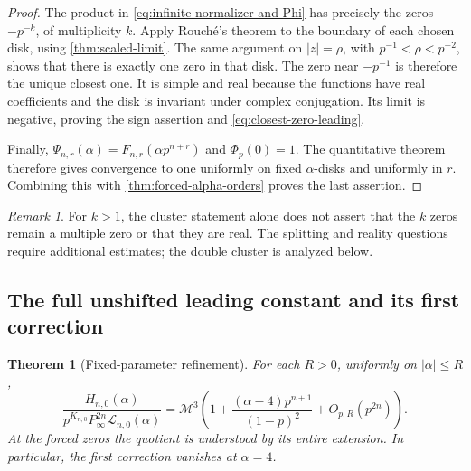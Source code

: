 \documentclass[11pt]{article}
\numberwithin{equation}{section}
\newtheorem{theorem}{Theorem}[section]
\theoremstyle{definition}
\theoremstyle{remark}
\newtheorem{remark}[remark]{Remark}
\begin{document}
\begin{proof}
The product in \eqref{eq:infinite-normalizer-and-Phi} has precisely the
zeros $-p^{-k}$, of multiplicity $k$. Apply Rouch\'e's theorem to the
boundary of each chosen disk, using \cref{thm:scaled-limit}.
The same argument on $|z|=\rho$, with $p^{-1}<\rho<p^{-2}$,
shows that there is exactly one zero in that disk. The zero near
$-p^{-1}$ is therefore the unique closest one. It is simple and real
because the functions have real coefficients and the disk is invariant
under complex conjugation. Its limit is negative, proving the sign
assertion and \eqref{eq:closest-zero-leading}.

Finally,
$\Psi_{n,r}(\alpha)=F_{n,r}(\alpha p^{n+r})$ and $\Phi_p(0)=1$.
The quantitative theorem therefore gives convergence to one uniformly
on fixed $\alpha$-disks and uniformly in $r$. Combining this with
\cref{thm:forced-alpha-orders} proves the last assertion.
\end{proof}

\begin{remark}
For $k>1$, the cluster statement alone does not assert that the $k$
zeros remain a multiple zero or that they are real. The splitting and
reality questions require additional estimates; the double cluster is
analyzed below.
\end{remark}

\subsection{The full unshifted leading constant and its first correction}

\begin{theorem}[Fixed-parameter refinement]\label{thm:fixed-alpha-refinement}
For each $R>0$, uniformly on $|\alpha|\le R$,
\begin{equation}\label{eq:fixed-alpha-refinement}
 \frac{H_{n,0}(\alpha)}
 {p^{K_{n,0}}P_\infty^{2n}\mathcal L_{n,0}(\alpha)}
 =\mathcal M^3\left(
  1+\frac{(\alpha-4)p^{n+1}}{(1-p)^2}
  +O_{p,R}(p^{2n})\right).
\end{equation}
At the forced zeros the quotient is understood by its entire extension.
In particular, the first correction vanishes at $\alpha=4$.
\end{theorem}
\end{document}
